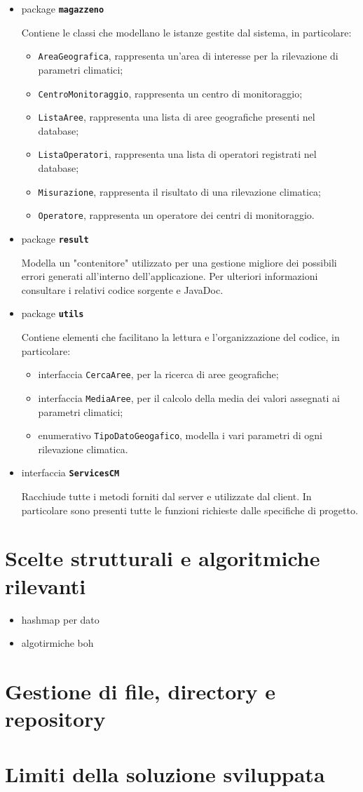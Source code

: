 \begin{itemize}
	\item package \textbf{\texttt{magazzeno}}
		
		Contiene le classi che modellano le istanze gestite dal sistema, in particolare:
		\begin{itemize}
			\item \texttt{AreaGeografica}, rappresenta un'area di interesse per la rilevazione di parametri climatici;
			\item \texttt{CentroMonitoraggio}, rappresenta un centro di monitoraggio;
			\item \texttt{ListaAree}, rappresenta una lista di aree geografiche presenti nel database;
			\item \texttt{ListaOperatori}, rappresenta una lista di operatori registrati nel database;
			\item \texttt{Misurazione}, rappresenta il risultato di una rilevazione climatica;
			\item \texttt{Operatore}, rappresenta un operatore dei centri di monitoraggio.
		\end{itemize}
	\item package \textbf{\texttt{result}}
		
		Modella un "contenitore" utilizzato per una gestione migliore dei possibili errori generati all'interno dell'applicazione.
		Per ulteriori informazioni consultare i relativi codice sorgente e JavaDoc.
	\item package \textbf{\texttt{utils}}
		
		Contiene elementi che facilitano la lettura e l'organizzazione del codice, in particolare:
		\begin{itemize}
			\item interfaccia \texttt{CercaAree}, per la ricerca di aree geografiche;
			\item interfaccia \texttt{MediaAree}, per il calcolo della media dei valori assegnati ai parametri climatici;
			\item enumerativo \texttt{TipoDatoGeogafico}, modella i vari parametri di ogni rilevazione climatica.
		\end{itemize}
	\item interfaccia \textbf{\texttt{ServicesCM}}
	
		Racchiude tutte i metodi forniti dal server e utilizzate dal client. In particolare sono presenti tutte le funzioni richieste dalle specifiche di progetto.
\end{itemize}

\chapter{Scelte strutturali e algoritmiche rilevanti}
\begin{itemize}
	\item hashmap per dato
	\item algotirmiche boh
\end{itemize}
\chapter{Gestione di file, directory e repository}

\chapter{Limiti della soluzione sviluppata}

\nocite{IuriTex}



